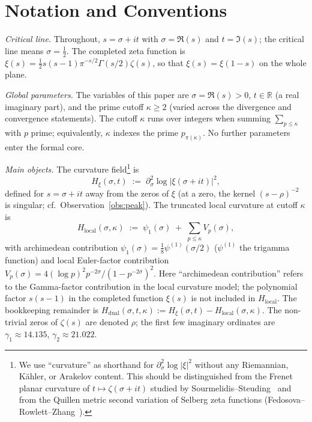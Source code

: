 \documentclass[11pt]{article}
\newcommand{\Hxi}{H_{\xi}}
\newcommand{\Hlocal}{H_{\mathrm{local}}}
\newcommand{\Hdual}{H_{\mathrm{dual}}}
\begin{document}
\vspace{2em}

\section*{Notation and Conventions}
\label{sec:notation}

\emph{Critical line.}
Throughout, $s=\sigma+it$ with $\sigma=\Re(s)$ and $t=\Im(s)$;
the critical line means $\sigma=\tfrac12$.
The completed zeta function is
$\xi(s)=\tfrac12 s(s-1)\pi^{-s/2}\Gamma(s/2)\zeta(s)$, so that
$\xi(s)=\xi(1-s)$ on the whole plane.

\medskip
\emph{Global parameters.}
The variables of this paper are $\sigma=\Re(s)>0$, $t\in\mathbb{R}$ (a real imaginary part), and
the prime cutoff $\kappa\ge 2$ (varied across the divergence
and convergence statements).
The cutoff $\kappa$ runs over integers when summing
$\sum_{p\le\kappa}$ with $p$ prime; equivalently, $\kappa$
indexes the prime $p_{\pi(\kappa)}$.
No further parameters enter the formal core.

\medskip
\emph{Main objects.}
The curvature field\footnote{We use ``curvature'' as shorthand
for $\partial_\sigma^2\log\lvert\xi\rvert^2$ without any
Riemannian, K\"ahler, or Arakelov content. This should be
distinguished from the Frenet planar curvature of
$t\mapsto\zeta(\sigma+it)$ studied by
Sourmelidis--Steuding~\cite{SourmelidisSteuding24}
and from the Quillen metric second variation of Selberg
zeta functions
(Fedosova--Rowlett--Zhang~\cite{FedosovaRowlettZhang20}).}
is
\[
\Hxi(\sigma,t)\;:=\;\partial_{\sigma}^{2}\log
\lvert\xi(\sigma+it)\rvert^{2},
\]
defined for $s=\sigma+it$ away from the zeros of $\xi$
(at a zero, the kernel $(s-\rho)^{-2}$ is singular;
cf.\ Observation~\ref{obs:peak}).
The truncated local curvature at cutoff $\kappa$ is
\[
\Hlocal(\sigma,\kappa)\;:=\;\psi_1(\sigma)
\;+\;\sum_{p\le\kappa}V_p(\sigma),
\]
with archimedean contribution
$\psi_1(\sigma)=\tfrac18\psi^{(1)}(\sigma/2)$
($\psi^{(1)}$ the trigamma function) and local Euler-factor
contribution $V_p(\sigma)=4(\log p)^2 p^{-2\sigma}/
(1-p^{-2\sigma})^2$.
Here ``archimedean contribution'' refers to the Gamma-factor
contribution in the local curvature model; the polynomial
factor $s(s-1)$ in the completed function $\xi(s)$ is not
included in $\Hlocal$.
The bookkeeping remainder is
$\Hdual(\sigma,t,\kappa):=\Hxi(\sigma,t)-\Hlocal(\sigma,\kappa)$.
The non-trivial zeros of $\zeta(s)$ are denoted $\rho$; the
first few imaginary ordinates are $\gamma_1\approx 14.135$,
$\gamma_2\approx 21.022$.
\end{document}
